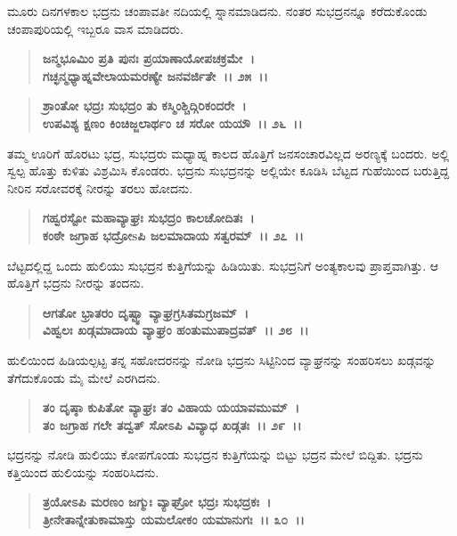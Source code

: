 ಮೂರು ದಿನಗಳಕಾಲ ಭದ್ರನು ಚಂಪಾವತೀ ನದಿಯಲ್ಲಿ ಸ್ನಾನಮಾಡಿದನು. ನಂತರ ಸುಭದ್ರನನ್ನೂ ಕರೆದುಕೊಂಡು ಚಂಪಾಪುರಿಯಲ್ಲಿ ಇಬ್ಬರೂ ವಾಸ ಮಾಡಿದರು.

\begin{verse}
\textbf{ಜನ್ಮಭೂಮಿಂ ಪ್ರತಿ ಪುನಃ ಪ್ರಯಾಣಾಯೋಪಚಕ್ರಮೇ~।}\\\textbf{ಗಚ್ಛನ್ಮಧ್ಯಾಹ್ನವೇಲಾಯಮರಣ್ಯೇ ಜನವರ್ಜಿತೇ~।। ೨೫~।। }
\end{verse}

\begin{verse}
\textbf{ಶ್ರಾಂತೋ ಭದ್ರಃ ಸುಭದ್ರಂ ತು ಕಸ್ಮಿಂಶ್ಚಿದ್ಗಿರಿಕಂದರೇ~।}\\\textbf{ಉಪವಿಶ್ಯ ಕ್ಷಣಂ ಕಿಂಚಿಜ್ಜಲಾರ್ಥಂ ಚ ಸರೋ ಯಯೌ~।। ೨೬~।।}
\end{verse}

ತಮ್ಮ ಊರಿಗೆ ಹೊರಟು ಭದ್ರ, ಸುಭದ್ರರು ಮಧ್ಯಾಹ್ನ ಕಾಲದ ಹೊತ್ತಿಗೆ ಜನಸಂಚಾರವಿಲ್ಲದ ಅರಣ್ಯಕ್ಕೆ ಬಂದರು. ಅಲ್ಲಿ ಸ್ವಲ್ಪ ಹೊತ್ತು ಕುಳಿತು ವಿಶ್ರಮಿಸಿ ಕೊಂಡರು. ಭದ್ರನು ಸುಭದ್ರನನ್ನು ಅಲ್ಲಿಯೇ ಕೂಡಿಸಿ ಬೆಟ್ಟದ ಗುಹೆಯಿಂದ ಬರುತ್ತಿದ್ದ ನೀರಿನ ಸರೋವರಕ್ಕೆ ನೀರನ್ನು ತರಲು ಹೋದನು.

\begin{verse}
\textbf{ಗಹ್ವರಸ್ಟೋ ಮಹಾವ್ಯಾಘ್ರಃ ಸುಭದ್ರಂ ಕಾಲಚೋದಿತಃ~।}\\\textbf{ಕಂಠೇ ಜಗ್ರಾಹ ಭದ್ರೋsಪಿ ಜಲಮಾದಾಯ ಸತ್ವರಮ್~।। ೨೭~।।}
\end{verse}

ಬೆಟ್ಟದಲ್ಲಿದ್ದ ಒಂದು ಹುಲಿಯು ಸುಭದ್ರನ ಕುತ್ತಿಗೆಯನ್ನು ಹಿಡಿಯಿತು. ಸುಭದ್ರನಿಗೆ ಅಂತ್ಯಕಾಲವು ಪ್ರಾಪ್ತವಾಗಿತ್ತು. ಆ ಹೊತ್ತಿಗೆ ಭದ್ರನು ನೀರನ್ನು ತಂದನು.

\begin{verse}
\textbf{ಆಗತೋ ಭ್ರಾತರಂ ದೃಷ್ಟ್ವಾ ವ್ಯಾಘ್ರಗ್ರಸಿತಮಗ್ರಜಮ್~।}\\\textbf{ವಿಹ್ವಲಃ ಖಡ್ಗಮಾದಾಯ ವ್ಯಾಘ್ರಂ ಹಂತುಮುಪಾದ್ರವತ್~।। ೨೮~।।}
\end{verse}

ಹುಲಿಯಿಂದ ಹಿಡಿಯಲ್ಪಟ್ಟ ತನ್ನ ಸಹೋದರನನ್ನು ನೋಡಿ ಭದ್ರನು ಸಿಟ್ಟಿನಿಂದ ವ್ಯಾಘ್ರನನ್ನು ಸಂಹರಿಸಲು ಖಡ್ಗವನ್ನು ತೆಗೆದುಕೊಂಡು ಮೈ ಮೇಲೆ ಎರಗಿದನು.

\begin{verse}
\textbf{ತಂ ದೃಷ್ಠಾ ಕುಪಿತೋ ವ್ಯಾಘ್ರಃ ತಂ ವಿಹಾಯ ಯಯಾವಮುಮ್~।}\\\textbf{ತಂ ಜಗ್ರಾಹ ಗಲೇ ತದ್ವತ್ ಸೋಽಪಿ ವಿವ್ಯಾಧ ಖಡ್ಗತಃ~।। ೨೯~।।}
\end{verse}

ಭದ್ರನನ್ನು ನೋಡಿ ಹುಲಿಯು ಕೋಪಗೊಂಡು ಸುಭದ್ರನ ಕುತ್ತಿಗೆಯನ್ನು ಬಿಟ್ಟು ಭದ್ರನ ಮೇಲೆ ಬಿದ್ದಿತು. ಭದ್ರನು ಕತ್ತಿಯಿಂದ ಹುಲಿಯನ್ನು ಸಂಹರಿಸಿದನು.

\begin{verse}
\textbf{ತ್ರಯೋಽಪಿ ಮರಣಂ ಜಗ್ಮುಃ ವ್ಯಾಘ್ರೋ ಭದ್ರಃ ಸುಭದ್ರಕಃ~।}\\\textbf{ತ್ರೀನೇತಾನ್ನೇತುಕಾಮಾಸ್ತು ಯಮಲೋಕಂ ಯಮಾನುಗಃ~।। ೩೦~।।} 
\end{verse}


